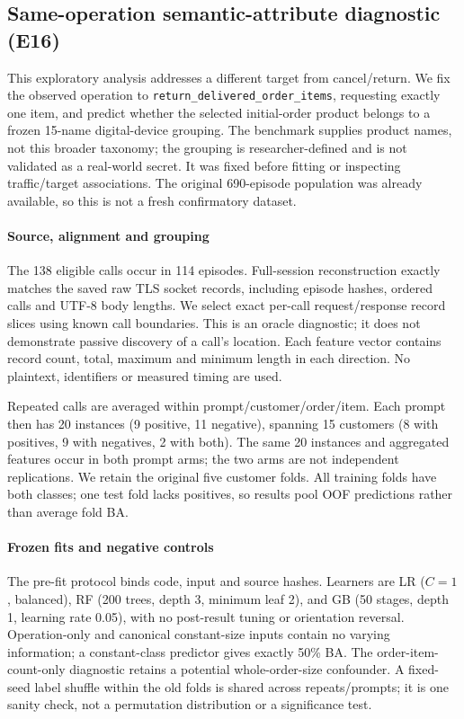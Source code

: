 \subsection{Same-operation semantic-attribute diagnostic (E16)}\label{sec:r8-attribute}
This exploratory analysis addresses a different target from cancel/return. We fix the observed operation to \texttt{return\_delivered\_order\_items}, requesting exactly one item, and predict whether the selected initial-order product belongs to a frozen 15-name digital-device grouping. The benchmark supplies product names, not this broader taxonomy; the grouping is researcher-defined and is not validated as a real-world secret. It was fixed before fitting or inspecting traffic/target associations. The original 690-episode population was already available, so this is not a fresh confirmatory dataset.

\paragraph{Source, alignment and grouping}
The 138 eligible calls occur in 114 episodes. Full-session reconstruction exactly matches the saved raw TLS socket records, including episode hashes, ordered calls and UTF-8 body lengths. We select exact per-call request/response record slices using known call boundaries. This is an oracle diagnostic; it does not demonstrate passive discovery of a call's location. Each feature vector contains record count, total, maximum and minimum length in each direction. No plaintext, identifiers or measured timing are used.

Repeated calls are averaged within prompt/customer/order/item. Each prompt then has 20 instances (9 positive, 11 negative), spanning 15 customers (8 with positives, 9 with negatives, 2 with both). The same 20 instances and aggregated features occur in both prompt arms; the two arms are not independent replications. We retain the original five customer folds. All training folds have both classes; one test fold lacks positives, so results pool OOF predictions rather than average fold BA.

\paragraph{Frozen fits and negative controls}
The pre-fit protocol binds code, input and source hashes. Learners are LR ($C=1$, balanced), RF (200 trees, depth 3, minimum leaf 2), and GB (50 stages, depth 1, learning rate 0.05), with no post-result tuning or orientation reversal. Operation-only and canonical constant-size inputs contain no varying information; a constant-class predictor gives exactly 50\% BA. The order-item-count-only diagnostic retains a potential whole-order-size confounder. A fixed-seed label shuffle within the old folds is shared across repeats/prompts; it is one sanity check, not a permutation distribution or a significance test.

